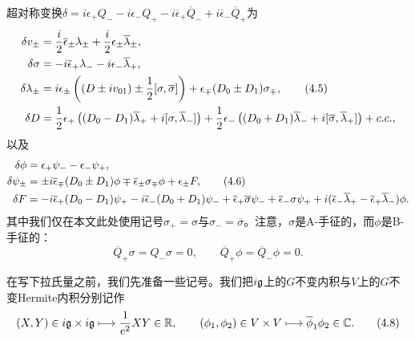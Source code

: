 
超对称变换$\delta=i\epsilon_+Q_--i\epsilon_-Q_+-i\overline{\epsilon}_+\overline{Q}_-+i\overline{\epsilon}_-\overline{Q}_+$为
\begin{align}
\delta v_\pm &= \frac{i}{2}\overline{\epsilon}_\pm\lambda_\pm+\frac{i}{2}\epsilon_\pm\overline{\lambda}_\pm,\notag\\
\delta\sigma &= -i\overline{\epsilon}_+\lambda_--i\epsilon_-\overline{\lambda}_+,\notag\\
\delta\lambda_\pm &= i\epsilon_\pm\left((D\pm iv_{01})\pm\frac{1}{2}[\sigma,\overline{\sigma}]\right)+\epsilon_\mp(D_0\pm D_1)\sigma_\mp,\tag{4.5}\\
\delta D &= \frac{1}{2}\epsilon_+\left((D_0-D_1)\overline{\lambda}_++i[\sigma,\overline{\lambda}_-]\right)
+\frac{1}{2}\epsilon_-\left((D_0+D_1)\overline{\lambda}_-+i[\overline{\sigma},\overline{\lambda}_+]\right)+c.c.,\notag
\end{align}
以及
\begin{align}
\delta\phi &= \epsilon_+\psi_--\epsilon_-\psi_+,\notag\\
\delta\psi_\pm &= \pm i\overline{\epsilon}_\mp(D_0\pm D_1)\phi\mp\overline{\epsilon}_\pm\sigma_\mp\phi+\epsilon_\pm F,\tag{4.6}\\
\delta F &= -i\overline{\epsilon}_+(D_0-D_1)\psi_+-i\overline{\epsilon}_-(D_0+D_1)\psi_-
+\overline{\epsilon}_+\overline{\sigma}\psi_-+\overline{\epsilon}_-\sigma\psi_+
+i(\overline{\epsilon}_-\overline{\lambda}_+-\overline{\epsilon}_+\overline{\lambda}_-)\phi.\notag
\end{align}
其中我们仅在本文此处使用记号$\sigma_+=\sigma$与$\sigma_-=\overline{\sigma}$。注意，$\sigma$是A-手征的，而$\phi$是B-手征的：
\begin{equation}
\overline{Q}_+\sigma=Q_-\sigma=0,\qquad \overline{Q}_+\phi=\overline{Q}_-\phi=0.
\tag{4.7}
\end{equation}


在写下拉氏量之前，我们先准备一些记号。我们把$i\mathfrak{g}$上的$G$不变内积与$V$上的$G$不变Hermite内积分别记作
\begin{equation}
(X,Y)\in i\mathfrak{g}\times i\mathfrak{g}\longmapsto\frac{1}{e^2}XY\in\mathbb{R},\qquad
(\phi_1,\phi_2)\in V\times V\longmapsto\overline{\phi}_1\phi_2\in\mathbb{C}.
\tag{4.8}
\end{equation}


